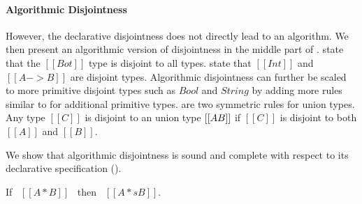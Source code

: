 \begin{comment}
\begin{figure}[t]
  \begin{small}
    \centering
    \drules[ad]{$[[A * B]]$}{Algorithmic Disjointness}{btmr, btml, intl, intr, orl, orr}
  \end{small}
  \caption{Algorithmic Disjointness for \cal.}
  \label{fig:union:ad}
\end{figure}
\end{comment}

\paragraph{Algorithmic Disjointness}
However, the declarative disjointness does not directly lead to an algorithm.
We then present an algorithmic version of disjointness in
the middle part of .
 state that the $[[Bot]]$
type is disjoint to all types.   state that
$[[Int]]$ and $[[A -> B]]$ are disjoint types.  Algorithmic
disjointness can further be scaled to more primitive disjoint types
such as $Bool$ and $String$ by adding more rules similar to
 for additional primitive types.
 are two symmetric rules for union types. Any type $[[C]]$ is
disjoint to an union type $[[A \/ B]]$ if $[[C]]$ is disjoint to both
$[[A]]$ and $[[B]]$.

We show that algorithmic disjointness is sound and complete
with respect to its declarative specification ().

\begin{lemma}
  If \ $[[A * B]]$ \ then \ $[[A *s B]]$.
\label{lemma:union:disj-sound}
\end{lemma}

\begin{comment}
\begin{proof}
  By induction on algorithmic disjointness relation.
  \begin{itemize}
    \item Cases \rref{ad-btmr, ad-btml, ad-orl, ad-orr} require induction on hypothesis
          and \Cref{lemma:union:sub-or}.
    \item Cases \rref{ad-intl, ad-intr} require induction on type and \Cref{lemma:union:sub-or}.
  \end{itemize}
\end{proof}
\end{comment}

